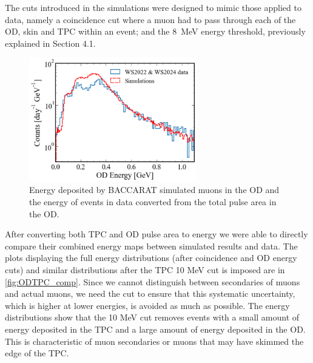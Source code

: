 The cuts introduced in the simulations were designed to mimic those applied to data, namely a coincidence cut where a muon had to pass through each of the OD, skin and TPC within an event; and the 8~MeV energy threshold, previously explained in Section 4.1. \\

\begin{figure}[htbp]
    \centering
    \includegraphics[width=0.65\textwidth]{figures/Muons/OD_comparison.pdf}
    \caption{Energy deposited by BACCARAT simulated muons in the OD and the energy of events in data converted from the total pulse area in the OD.}
    \label{fig:OD_comp}
\end{figure}
\par After converting both TPC and OD pulse area to energy we were able to directly compare their combined energy maps between simulated results and data. The plots displaying the full energy distributions (after coincidence and OD energy cuts) and similar distributions after the TPC 10 MeV cut is imposed are in \autoref{fig:ODTPC_comp}. Since we cannot distinguish between secondaries of muons and actual muons, we need the cut to ensure that this systematic uncertainty, which is higher at lower energies, is avoided as much as possible. The energy distributions show that the 10 MeV cut removes events with a small amount of energy deposited in the TPC and a large amount of energy deposited in the OD. This is characteristic of muon secondaries or muons that may have skimmed the edge of the TPC. 


